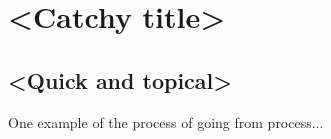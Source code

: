 \chapter{<Catchy title>}\label{chap:appendixA}
\section{<Quick and topical>}\label{sec:sectionA}
One example of the process of going from process... 

